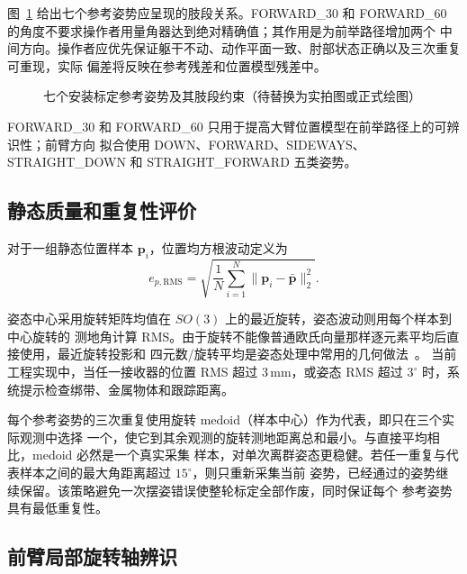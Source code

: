 图~\ref{fig:ch4_reference_pose_set} 给出七个参考姿势应呈现的肢段关系。FORWARD\_30 和
FORWARD\_60 的角度不要求操作者用量角器达到绝对精确值；其作用是为前举路径增加两个
中间方向。操作者应优先保证躯干不动、动作平面一致、肘部状态正确以及三次重复可重现，实际
偏差将反映在参考残差和位置模型残差中。

\begin{figure}[htbp]
  \centering
  \caption{七个安装标定参考姿势及其肢段约束（待替换为实拍图或正式绘图）}
  \label{fig:ch4_reference_pose_set}
\end{figure}

FORWARD\_30 和 FORWARD\_60 只用于提高大臂位置模型在前举路径上的可辨识性；前臂方向
拟合使用 DOWN、FORWARD、SIDEWAYS、STRAIGHT\_DOWN 和 STRAIGHT\_FORWARD 五类姿势。

\subsection{静态质量和重复性评价}
\label{subsec:ch4_static_quality_repeatability}

对于一组静态位置样本 $\boldsymbol p_i$，位置均方根波动定义为
\begin{equation}
  e_{p,\mathrm{RMS}}=
  \sqrt{\frac{1}{N}\sum_{i=1}^{N}
  \lVert\boldsymbol p_i-\bar{\boldsymbol p}\rVert_2^2}.
  \label{eq:ch4_static_position_rms}
\end{equation}

姿态中心采用旋转矩阵均值在 $SO(3)$ 上的最近旋转，姿态波动则用每个样本到中心旋转的
测地角计算 RMS。由于旋转不能像普通欧氏向量那样逐元素平均后直接使用，最近旋转投影和
四元数/旋转平均是姿态处理中常用的几何做法~\cite{hartley2013rotation,markley2007averaging}。
当前工程实现中，当任一接收器的位置 RMS 超过 $3\,\mathrm{mm}$，或姿态
RMS 超过 $3^\circ$ 时，系统提示检查绑带、金属物体和跟踪距离。

每个参考姿势的三次重复使用旋转 medoid（样本中心）作为代表，即只在三个实际观测中选择
一个，使它到其余观测的旋转测地距离总和最小。与直接平均相比，medoid 必然是一个真实采集
样本，对单次离群姿态更稳健。若任一重复与代表样本之间的最大角距离超过 $15^\circ$，则只重新采集当前
姿势，已经通过的姿势继续保留。该策略避免一次摆姿错误使整轮标定全部作废，同时保证每个
参考姿势具有最低重复性。

\subsection{前臂局部旋转轴辨识}
\label{subsec:ch4_forearm_twist_axis}

